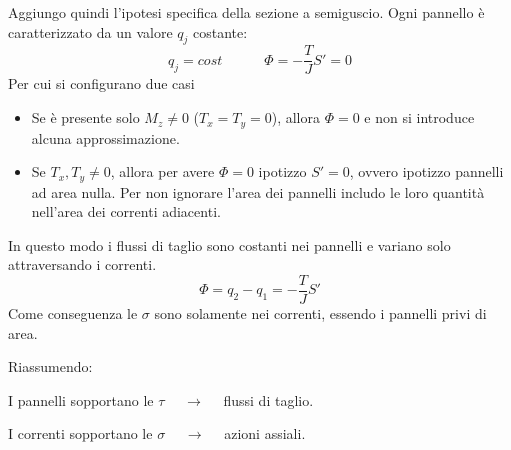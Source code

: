 Aggiungo quindi l'ipotesi specifica della sezione a semiguscio. Ogni pannello è caratterizzato da un valore $q_j$ costante:
    \begin{equation*}
        q_j=cost  \quad\quad \quad  \Phi = - \frac{T}{J}S'=0
    \end{equation*}
    Per cui si configurano due casi
    \begin{itemize}
        \item Se è presente solo $M_z \neq0$ ($T_x=T_y=0$), allora $\Phi=0$ e non si introduce alcuna approssimazione.\\
        \item Se $T_x,T_y\neq0$, allora per avere $\Phi=0$ ipotizzo $S'=0$, ovvero ipotizzo pannelli ad area nulla. Per non ignorare l'area dei pannelli includo le loro quantità nell'area dei correnti adiacenti.
    \end{itemize}
In questo modo i flussi di taglio sono costanti nei pannelli e variano solo attraversando i correnti.
\begin{equation*}
       \Phi =  q_2 - q_1= - \frac{T}{J}S'
    \end{equation*}
    Come conseguenza le $\sigma$ sono solamente nei correnti, essendo i pannelli privi di area.

Riassumendo:
\begin{compactitem}
    \item I pannelli sopportano le $\tau$ $\quad\rightarrow\quad$ flussi di taglio.\\
    \item I correnti sopportano le $\sigma$ $\quad\rightarrow\quad$ azioni assiali.
\end{compactitem}


